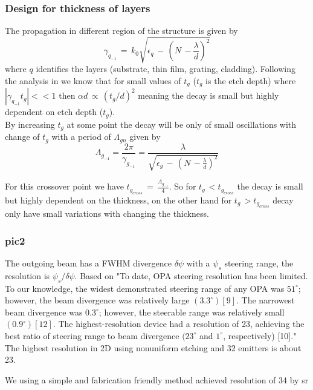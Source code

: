 \documentclass{article}
\begin{document}
\subsubsection{Design for thickness of layers}
\label{thicknessLayers}
The propagation in different region of the structure is given by 
\begin{equation}
\gamma_{q_{-1}} \, = \, k_0\sqrt{\epsilon_q \, - \, (N \, - \frac{\lambda}{d})^2 }
\end{equation}
where $q$ identifies the layers (substrate, thin film, grating, cladding). Following the analysis in \cite{00248941} we know that for small values of $t_g$ ($t_{g}$ is the etch depth) where $|\gamma_{q_{-1}} t_g| <<1$ then $\alpha d \, \propto \, (t_g/d)^2$ meaning the decay is small but highly dependent on etch depth ($t_g$).\\
By increasing $t_g$ at some point the decay will be only of small oscillations with change of $t_g$ with a period of $\Lambda_{gn}$ given by
\begin{equation}
\Lambda_{g_{-1}} = \frac{2\pi}{\gamma_{g_{-1}} } =  \frac{\lambda}{\sqrt{\epsilon_g \, - \, (N \, - \frac{\lambda}{d})^2}  } 
\end{equation}

For this crossover point we have $t_{g_{cross}} \, = \, \frac{\Lambda_{g_{-1}}}{4} $. So for $t_g \, < t_{g_{cross}} $ the decay is small but highly dependent on the thickness, on the other hand for  $t_g \, > t_{g_{cross}} $ decay only have small variations with changing the thickness.

\subsubsection{pic2}
\label{pic2}
The outgoing beam has a FWHM divergence $\delta  \psi$ with a $\psi_s$ steering range, the resolution is $\psi_s / \delta  \psi$. Based on \cite{pic2} "To date, OPA steering resolution has been limited. To our knowledge, the widest demonstrated steering range of any OPA
was $51^{\circ}$; however, the beam divergence was relatively large $(3.3^{\circ})[9]$. The narrowest beam divergence was $0.3^{\circ}$; however, the steerable range was relatively small $(0.9^{\circ}) [12]$. The highest-resolution device had a resolution of 23, achieving the best ratio of steering range to beam divergence $(23^{\circ}$ and $1^{\circ}$, respectively) [10]."
The highest resolution in 2D using nonuniform etching and 32 emitters is about 23.


We using a simple and fabrication friendly method achieved resolution of 34 by sr
\end{document}
